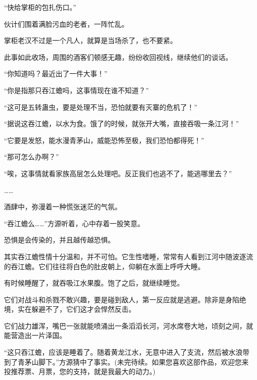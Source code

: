 \begin{this_body}
“快给掌柜的包扎伤口。”

伙计们围着满脸污血的老者，一阵忙乱。

掌柜老汉不过是一个凡人，就算是当场杀了，也不要紧。

此事如此收场，周围的酒客们顿感无趣，纷纷收回视线，继续他们的谈话。

“你知道吗？最近出了一件大事！”

“你是指那只吞江蟾吗，这事情现在谁不知道？”

“这可是五转蛊虫，要是处理不当，恐怕就要有灭寨的危机了！”

“据说这吞江蟾，以水为食。饿了的时候，就张开大嘴，直接吞吸一条江河！”

“它要是发怒，能水漫青茅山，威能恐怖至极，我们恐怕都得死！”

“那可怎么办啊？”

“唉，这事情就看家族高层怎么处理吧。反正我们也逃不了，能逃哪里去？”

……

酒肆中，弥漫着一种慌张迷茫的气氛。

“吞江蟾么……”方源听着，心中存着一股笑意。

恐惧是会传染的，并且越传越恐惧。

其实吞江蟾性情十分温和，并不可怕。它生性嗜睡，常常有人看到江河中随波逐流的吞江蟾。它们往往将白色的肚皮朝上，仰躺在水面上呼呼大睡。

有时候睡醒了，就吞吸江水果腹。饱了之后，就继续睡觉。

它们对战斗和杀戮不敢兴趣，要是碰到敌人，第一反应就是逃避。除非是身陷绝境，实在躲避不了，它们这才会悍然反击。

它们战力雄浑，嘴巴一张就能喷涌出一条滔滔长河，河水席卷大地，顷刻之间，就能营造出一片泽国。

“这只吞江蟾，应该是睡着了。随着黄龙江水，无意中进入了支流，然后被水浪带到了青茅山脚下。”方源猜中了事实。(未完待续。如果您喜欢这部作品，欢迎您来投推荐票、月票，您的支持，就是我最大的动力。)

\end{this_body}

